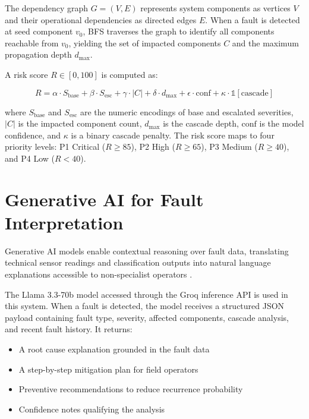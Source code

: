 The dependency graph $G = (V, E)$ represents system components as vertices $V$ and their operational dependencies as directed edges $E$. When a fault is detected at seed component $v_0$, BFS traverses the graph to identify all components reachable from $v_0$, yielding the set of impacted components $C$ and the maximum propagation depth $d_{\max}$.

A risk score $R \in [0, 100]$ is computed as:

\begin{equation}
R = \alpha \cdot S_{\text{base}} + \beta \cdot S_{\text{esc}} + \gamma \cdot |C| + \delta \cdot d_{\max} + \epsilon \cdot \text{conf} + \kappa \cdot \mathbb{1}[\text{cascade}]
\end{equation}

where $S_{\text{base}}$ and $S_{\text{esc}}$ are the numeric encodings of base and escalated severities, $|C|$ is the impacted component count, $d_{\max}$ is the cascade depth, $\text{conf}$ is the model confidence, and $\kappa$ is a binary cascade penalty. The risk score maps to four priority levels: P1 Critical ($R \geq 85$), P2 High ($R \geq 65$), P3 Medium ($R \geq 40$), and P4 Low ($R < 40$).

\section{Generative AI for Fault Interpretation}

Generative AI models enable contextual reasoning over fault data, translating technical sensor readings and classification outputs into natural language explanations accessible to non-specialist operators \cite{CNNDecisionTree2026}.

The Llama 3.3-70b model accessed through the Groq inference API is used in this system. When a fault is detected, the model receives a structured JSON payload containing fault type, severity, affected components, cascade analysis, and recent fault history. It returns:
\begin{itemize}
\setlength{\itemsep}{0pt}
\setlength{\parskip}{0pt}
\setlength{\parsep}{0pt}
\item A root cause explanation grounded in the fault data
\item A step-by-step mitigation plan for field operators
\item Preventive recommendations to reduce recurrence probability
\item Confidence notes qualifying the analysis
\end{itemize}

